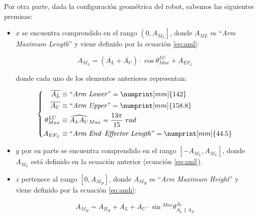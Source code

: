 Por otra parte, dada la configuración geométrica del robot, sabemos las siguientes premisas:

\begin{itemize}
    \item $x$ se encuentra comprendido en el rango $\left(0, A_{M_L}\right]$, donde $A_{ML}$
          es ``\textit{Arm Maximum Length}'' y viene definido por la ecuación \ref{eq:aml}:

          \begin{equation}\label{eq:aml}
              A_{M_L} = \left(\overline{A_L} + \overline{A_U}\right) \cdot \cos{\theta^{LU}_{Max}} + A_{EF_L}
          \end{equation}

          donde cada uno de los elementos anteriores representan:

          \begin{equation*}
              \left\{\begin{aligned}
                  \overline{A_L}    & \equiv \text{``\textit{Arm Lower}''} = \numprint[mm]{142}                 \\
                  \overline{A_U}    & \equiv \text{``\textit{Arm Upper}''} = \numprint[mm]{158.8}               \\
                  \theta^{LU}_{Max} & \equiv \widehat{A_L A_U}_{Max} = \frac{13\pi}{15}~rad                     \\
                  A_{EF_L}          & \equiv \text{``\textit{Arm End--Effector Length}''} = \numprint[mm]{44.5} \\
              \end{aligned}
              \right.
          \end{equation*}

    \item $y$ por su parte se encuentra comprendido en el rango $\left[-A_{M_L}, A_{M_L}\right]$,
          donde $A_{M_L}$ está definido en la ecuación anterior (ecuación \ref{eq:aml}).
    \item $z$ pertenece al rango $\left[0, A_{M_H}\right]$, donde $A_{M_H}$ es
          ``\textit{Arm Maximum Height}'' y viene definido por la ecuación \ref{eq:amh}:

          \begin{equation}\label{eq:amh}
              A_{M_H} = A_{B_H} + \overline{A_L} + \overline{A_U} \cdot \sin{^{Max}\theta^{A_U}_{A_L \parallel A_B}}
          \end{equation}


\end{itemize}
